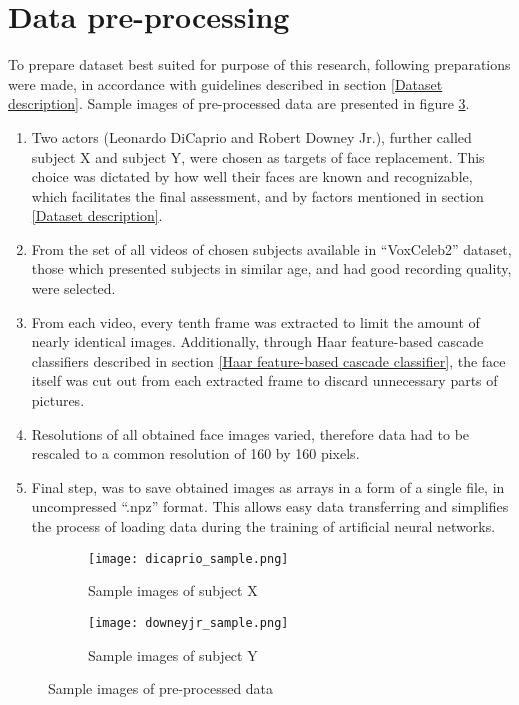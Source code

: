 \section{Data pre-processing}
\label{Data pre-processing}
To prepare dataset best suited for purpose of this research, following preparations were made, in accordance with guidelines described in section \ref{Dataset description}. Sample images of pre-processed data are presented in figure \ref{fig:subjects_sample}.

\begin{enumerate}
\item Two actors (Leonardo DiCaprio and Robert Downey Jr.), further called subject X and subject Y, were chosen as targets of face replacement. This choice was dictated by how well their faces are known and recognizable, which facilitates the final assessment, and by factors mentioned in section \ref{Dataset description}.

\item From the set of all videos of chosen subjects available in ``VoxCeleb2'' dataset, those which presented subjects in similar age, and had good recording quality, were selected.

\item From each video, every tenth frame was extracted to limit the amount of nearly identical images. Additionally, through Haar feature-based cascade classifiers described in section \ref{Haar feature-based cascade classifier}, the face itself was cut out from each extracted frame to discard unnecessary parts of pictures.

\item Resolutions of all obtained face images varied, therefore data had to be rescaled to a common resolution of 160 by 160 pixels.

\item Final step, was to save obtained images as arrays in a form of a single file, in uncompressed ``.npz'' format. This allows easy data transferring and simplifies the process of loading data during the training of artificial neural networks.
\end{enumerate}

\begin{figure}[H]
\centering
\begin{subfigure}{.5\textwidth}
  \centering
  \texttt{[image: dicaprio\_sample.png]}
  \caption{Sample images of subject X}
  \label{subfig:subject_A_sample}
\end{subfigure}%
\begin{subfigure}{.5\textwidth}
  \centering
  \texttt{[image: downeyjr\_sample.png]}
  \caption{Sample images of subject Y}
  \label{subfig:subject_B_sample}
\end{subfigure}
\caption{Sample images of pre-processed data}
\label{fig:subjects_sample}
\end{figure}

